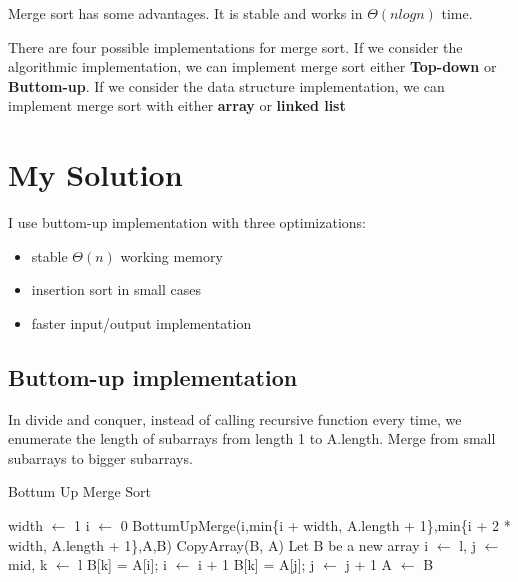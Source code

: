 \documentclass{report}
\begin{document}
\noindent
Merge sort has some advantages. It is stable and works in $\Theta(nlogn)$ time.

\noindent
There are four possible implementations for merge sort. If we consider the algorithmic implementation, we can implement merge sort either \textbf{Top-down} or \textbf{Buttom-up}. If we consider the data structure implementation, we can implement merge sort with either \textbf{array} or \textbf{linked list}

\section{My Solution}

I use buttom-up implementation with three optimizations:

\begin{itemize}
    \item stable $\Theta(n)$ working memory
    \item insertion sort in small cases
    \item faster input/output implementation
\end{itemize}

\subsection{Buttom-up implementation}

In divide and conquer, instead of calling recursive function every time, we enumerate the length of subarrays from length 1 to A.length.
Merge from small subarrays to bigger subarrays.

\begin{algorithm}
    \caption{Bottum Up Merge Sort}
    \label{euclid}
    \begin{algorithmic}[1] %
         
            \State width $\gets$ 1
             
                \State i $\gets$ 0
                    \State BottumUpMerge(i,min\{i + width, A.length + 1\},min\{i + 2 * width, A.length + 1\},A,B)
                \EndWhile
                \State CopyArray(B, A)
            \EndWhile
        \EndFunction
            \State Let B be a new array
            \State i $\gets$ l, j $\gets$ mid, k $\gets$ l
                    \State B[k] = A[i];
                    \State i $\gets$ i + 1
                \Else
                    \State B[k] = A[j];
                    \State j $\gets$ j + 1
                \EndIf
            \EndWhile
        \EndFunction
            \State A $\gets$ B
        \EndFunction
    \end{algorithmic}
\end{algorithm}
\end{document}
